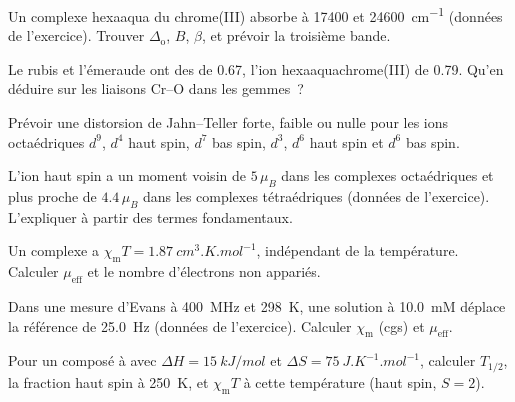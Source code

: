 \begin{exercise}[$\star\star$]\label{exo:b3:complex-spectra-magnetism:6}
Un complexe hexaaqua du chrome(III) absorbe à 17400 et \qty{24600}{cm^{-1}}
(données de l'exercice). Trouver $\Delta_{\mathrm o}$, $B$, $\beta$, et
prévoir la troisième bande.
\end{exercise}

\begin{exercise}[$\star\star$]\label{exo:b3:complex-spectra-magnetism:7}
Le rubis et l'émeraude ont des  de 0.67, l'ion
hexaaquachrome(III) de 0.79. Qu'en déduire sur les liaisons Cr--O dans les
gemmes~?
\end{exercise}

\begin{exercise}[$\star\star$]\label{exo:b3:complex-spectra-magnetism:8}
Prévoir une distorsion de Jahn--Teller forte, faible ou nulle pour les ions
octaédriques $d^9$, $d^4$ haut spin, $d^7$ bas spin, $d^3$, $d^6$ haut spin
et $d^6$ bas spin.
\end{exercise}

\begin{exercise}[$\star\star$]\label{exo:b3:complex-spectra-magnetism:9}
L'ion  haut spin a un moment voisin de $5\,\mu_B$ dans les
complexes octaédriques et plus proche de $4.4\,\mu_B$ dans les complexes
tétraédriques (données de l'exercice). L'expliquer à partir des termes
fondamentaux.
\end{exercise}

\begin{exercise}[$\star\star\star$]\label{exo:b3:complex-spectra-magnetism:10}
Un complexe a $\chi_{\mathrm m}T = \qty{1.87}{cm^3.K.mol^{-1}}$, indépendant de la température. Calculer $\mu_{\mathrm{eff}}$ et
le nombre d'électrons non appariés.
\end{exercise}

\begin{exercise}[$\star\star\star$]\label{exo:b3:complex-spectra-magnetism:11}
Dans une mesure d'Evans à \qty{400}{MHz} et \qty{298}{K}, une solution à
\qty{10.0}{mM} déplace la référence de \qty{25.0}{Hz} (données de
l'exercice). Calculer $\chi_{\mathrm m}$ (cgs) et $\mu_{\mathrm{eff}}$.
\end{exercise}

\begin{exercise}[$\star\star\star$]\label{exo:b3:complex-spectra-magnetism:12}
Pour un composé à  avec $\Delta H = \qty{15}{kJ/mol}$ et $\Delta S = \qty{75}{J.K^{-1}.mol^{-1}}$, calculer $T_{1/2}$,
la fraction haut spin à \qty{250}{K}, et $\chi_{\mathrm m}T$ à cette
température (haut spin, $S = 2$).
\end{exercise}

